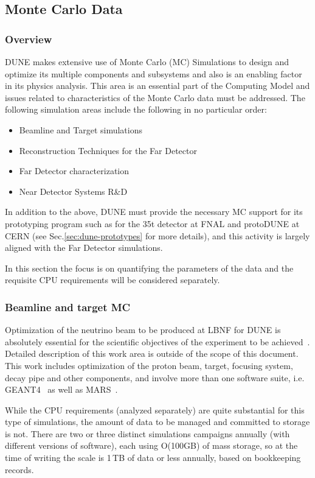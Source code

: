 \subsection{Monte Carlo Data}
\label{sec:mc-data-estimates}
\subsubsection{Overview}
DUNE makes extensive use of Monte Carlo (MC) Simulations to design and optimize its multiple components and
subsystems and also is an enabling factor in its physics analysis. This area is an essential part of the Computing Model
and issues related to characteristics of the Monte Carlo data must be addressed.
The following simulation areas include the following in no particular order:
\begin{itemize}
\item Beamline and Target simulations
\item Reconstruction Techniques for the Far Detector
\item Far Detector characterization
\item Near Detector Systems R\&D
\end{itemize}

\noindent
In addition to the above, DUNE must provide the necessary MC support for its prototyping program such as for the 35t detector
at FNAL and protoDUNE at CERN (see Sec.\ref{sec:dune-prototypes} for more details), and this activity is largely aligned with the Far
Detector simulations.

In this section the focus is on quantifying the parameters of the data and the requisite CPU requirements will be considered separately.

\subsubsection{Beamline and target MC}
Optimization of the neutrino beam to be produced at LBNF for DUNE is absolutely essential for the scientific objectives of the experiment
to be achieved~\cite{cdr_vol2}. Detailed description of this work area is outside of the scope of this document. This work includes
optimization of the proton beam, target, focusing system, decay pipe and other components, and involve more than one software suite,
i.e. GEANT4~\cite{geant4} as well as MARS~\cite{mars}.

While the CPU requirements (analyzed separately) are quite substantial for this type of simulations, the amount of data to be managed
and committed to storage is not. There are two or three distinct simulations campaigns annually (with different versions of software),
each using O(100GB) of mass storage, so at the time of writing the scale is 1\,TB of data or less annually, based on bookkeeping records.


